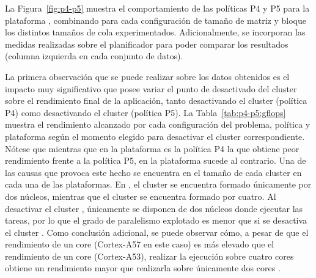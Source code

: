 \begin{table}

\end{table}


La Figura~\ref{fig:p4-p5} muestra el comportamiento de las políticas P4 y
P5 para la plataforma \juno, combinando para cada configuración de tamaño
de matriz y bloque los distintos tamaños de cola experimentados. 
Adicionalmente, se incorporan las medidas realizadas sobre el planificador
\botlev para poder comparar los resultados (columna izquierda en cada
conjunto de datos).

La primera observación que se puede realizar sobre los datos obtenidos es
el impacto muy significativo que posee variar el punto de desactivado del
cluster sobre el rendimiento final de la aplicación, tanto desactivando el
cluster \LITTLE (política P4) como desactivando el cluster \BIG (política
P5). La Tabla~\ref{tab:p4-p5:gflops} muestra el rendimiento alcanzado por
cada configuración del problema, política y plataforma según el momento
elegido para desactivar el cluster correspondiente. Nótese que mientras que
en la plataforma \juno es la política P4 la que obtiene peor rendimiento
frente a la política P5, en la plataforma \odroid sucede al contrario. Una
de las causas que provoca este hecho se encuentra en el tamaño de cada
cluster en cada una de las plataformas. En \juno, el cluster \BIG se
encuentra formado únicamente por dos núcleos, mientras que el cluster
\LITTLE se encuentra formado por cuatro. Al desactivar el cluster \LITTLE,
únicamente se disponen de dos núcleos donde ejecutar las tareas, por lo que
el grado de paralelismo explotado es menor que si se desactiva el cluster
\BIG. Como conclusión adicional, se puede observar cómo, a pesar de que el
rendimiento de un core \BIG (Cortex-A57 en este caso) es más elevado que el
rendimiento de un core \LITTLE (\mbox{Cortex-A53}), realizar la ejecución sobre
cuatro cores \LITTLE obtiene un rendimiento mayor que realizarla sobre
únicamente dos cores \BIG.


